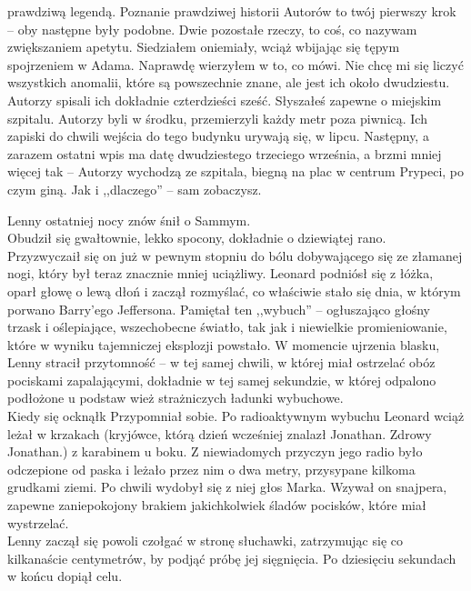 \documentclass[../MAIN.tex]{subfiles}
\begin{document}
prawdziwą legendą. Poznanie prawdziwej historii Autorów to twój pierwszy krok -- oby następne były podobne. Dwie pozostałe rzeczy, to coś, co nazywam zwiększaniem apetytu.
\qd
Siedziałem oniemiały, wciąż wbijając się tępym spojrzeniem w Adama. Naprawdę wierzyłem w to, co mówi.
\sx Nie chcę mi się liczyć wszystkich anomalii, które są powszechnie znane, ale jest ich około dwudziestu. Autorzy spisali ich dokładnie czterdzieści sześć. Słyszałeś zapewne o miejskim szpitalu. Autorzy byli w środku, przemierzyli każdy metr poza piwnicą. Ich zapiski do chwili wejścia do tego budynku urywają się, w lipcu. Następny, a zarazem ostatni wpis ma datę dwudziestego trzeciego września, a brzmi mniej więcej tak -- Autorzy wychodzą ze szpitala, biegną na plac w centrum Prypeci, po czym giną. Jak i ,,dlaczego'' -- sam zobaczysz.
\qd

Lenny ostatniej nocy znów śnił o Sammym.\\
Obudził się gwałtownie, lekko spocony, dokładnie o dziewiątej rano.\\ Przyzwyczaił się on już w pewnym stopniu do bólu dobywającego się ze złamanej nogi, który był teraz znacznie mniej uciążliwy. Leonard podniósł się z łóżka, oparł głowę o lewą dłoń i zaczął rozmyślać, co właściwie stało się dnia, w którym porwano Barry’ego Jeffersona. Pamiętał ten ,,wybuch'' -- ogłuszająco głośny trzask i oślepiające, wszechobecne światło, tak jak i niewielkie promieniowanie, które w wyniku tajemniczej eksplozji powstało. W momencie ujrzenia blasku, Lenny stracił przytomność -- w tej samej chwili, w której miał ostrzelać obóz pociskami zapalającymi, dokładnie w tej samej sekundzie, w której odpalono podłożone u podstaw wież strażniczych ładunki wybuchowe.\\
Kiedy się ocknął\3k Przypomniał sobie. Po radioaktywnym wybuchu Leonard wciąż leżał w krzakach (kryjówce, którą dzień wcześniej znalazł Jonathan. Zdrowy Jonathan.) z karabinem u boku. Z niewiadomych przyczyn jego radio było odczepione od paska i leżało przez nim o dwa metry, przysypane kilkoma grudkami ziemi. Po chwili wydobył się z niej głos Marka. Wzywał on snajpera, zapewne zaniepokojony brakiem jakichkolwiek śladów pocisków, które miał wystrzelać.\\
Lenny zaczął się powoli czołgać w stronę słuchawki, zatrzymując się co kilkanaście centymetrów, by podjąć próbę jej sięgnięcia. Po dziesięciu sekundach w końcu dopiął celu.
\end{document}
